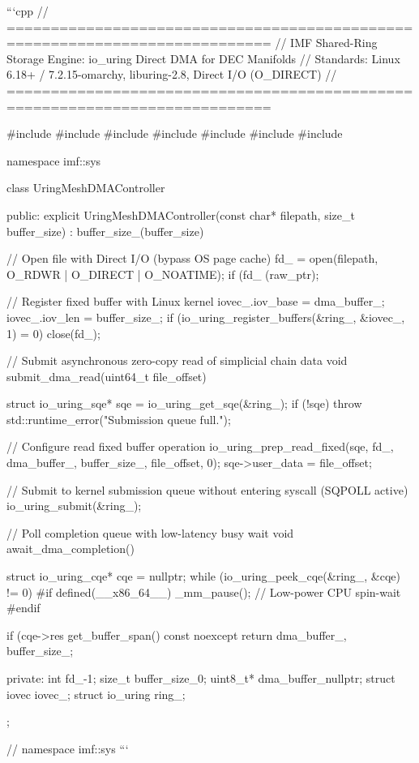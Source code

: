 \documentclass[11pt,twoside,openright]{amsbook}
\begin{document}
{{{{{```cpp
// ============================================================================
// IMF Shared-Ring Storage Engine: io_uring Direct DMA for DEC Manifolds
// Standards: Linux 6.18+ / 7.2.15-omarchy, liburing-2.8, Direct I/O (O_DIRECT)
// ============================================================================

#include 
#include 
#include 
#include 
#include 
#include 
#include 

namespace imf::sys {

class UringMeshDMAController {
public:
    explicit UringMeshDMAController(const char* filepath, size_t buffer_size)
        : buffer_size_(buffer_size) {
        
        // Open file with Direct I/O (bypass OS page cache)
        fd_ = open(filepath, O_RDWR | O_DIRECT | O_NOATIME);
        if (fd_ (raw_ptr);

        // Register fixed buffer with Linux kernel
        iovec_.iov_base = dma_buffer_;
        iovec_.iov_len = buffer_size_;
        if (io_uring_register_buffers(&ring_, &iovec_, 1) = 0) close(fd_);
    }

    // Submit asynchronous zero-copy read of simplicial chain data
    void submit_dma_read(uint64_t file_offset) {
        struct io_uring_sqe* sqe = io_uring_get_sqe(&ring_);
        if (!sqe) {
            throw std::runtime_error("Submission queue full.");
        }

        // Configure read fixed buffer operation
        io_uring_prep_read_fixed(sqe, fd_, dma_buffer_, buffer_size_, file_offset, 0);
        sqe->user_data = file_offset;

        // Submit to kernel submission queue without entering syscall (SQPOLL active)
        io_uring_submit(&ring_);
    }

    // Poll completion queue with low-latency busy wait
    void await_dma_completion() {
        struct io_uring_cqe* cqe = nullptr;
        while (io_uring_peek_cqe(&ring_, &cqe) != 0) {
            #if defined(__x86_64__)
            _mm_pause(); // Low-power CPU spin-wait
            #endif
        }

        if (cqe->res  get_buffer_span() const noexcept {
        return {dma_buffer_, buffer_size_};
    }

private:
    int fd_{-1};
    size_t buffer_size_{0};
    uint8_t* dma_buffer_{nullptr};
    struct iovec iovec_{};
    struct io_uring ring_{};
};

} // namespace imf::sys
```

}}}}}}
\end{document}
